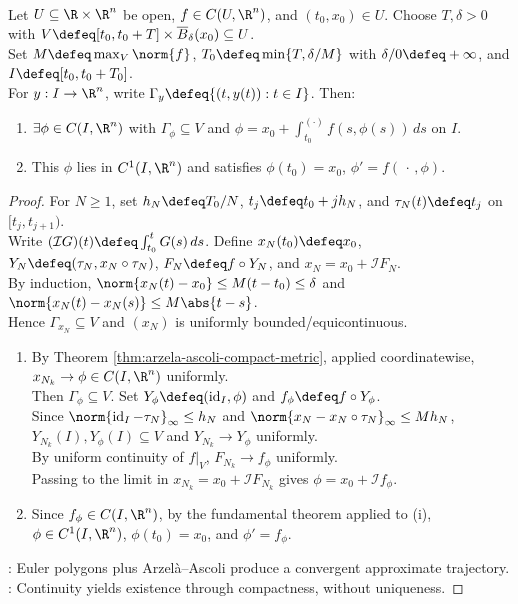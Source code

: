 \begin{theorem} \label{thm:peano-local-existence} \\
Let $U\subseteq\R\times\R^n$ be open, $f\in C(U,\R^n)$, and $(t_0,x_0)\in U$. Choose $T,\delta>0$ with $V\defeq[t_0,t_0+T]\times\overline B_\delta(x_0)\subseteq U$.\\
Set $M\defeq\max_V\norm{f}$, $T_0\defeq\min\{T,\delta/M\}$ with $\delta/0\defeq+\infty$, and $I\defeq[t_0,t_0+T_0]$.\\
For $y:I\to\R^n$, write $\Gamma_y\defeq\{(t,y(t)):t\in I\}$. Then:
\begin{enumerate}[label=(\roman*)]
\setlength{\itemsep}{0pt}
\item $\exists\phi\in C(I,\R^n)$ with $\Gamma_\phi\subseteq V$ and $\phi=x_0+\int_{t_0}^{(\cdot)} f(s,\phi(s))\,ds$ on $I$.
\item This $\phi$ lies in $C^1(I,\R^n)$ and satisfies $\phi(t_0)=x_0$, $\phi'=f(\,\cdot\,,\phi)$.
\end{enumerate}
\begin{proof}
For $N\geq1$, set $h_N\defeq T_0/N$, $t_j\defeq t_0+jh_N$, and $\tau_N(t)\defeq t_j$ on $[t_j,t_{j+1})$.\\
Write $(\mathcal IG)(t)\defeq\int_{t_0}^tG(s)\,ds$. Define $x_N(t_0)\defeq x_0$, $Y_N\defeq(\tau_N,x_N\circ\tau_N)$, $F_N\defeq f\circ Y_N$, and $x_N=x_0+\mathcal IF_N$.\\
By induction, $\norm{x_N(t)-x_0}\leq M(t-t_0)\leq\delta$ and $\norm{x_N(t)-x_N(s)}\leq M\abs{t-s}$.\\
Hence $\Gamma_{x_N}\subseteq V$ and $(x_N)$ is uniformly bounded/equicontinuous.
\begin{enumerate}[label=(\roman*)]
\setlength{\itemsep}{0pt}
\item By Theorem \ref{thm:arzela-ascoli-compact-metric}, applied coordinatewise, $x_{N_k}\to\phi\in C(I,\R^n)$ uniformly.\\
Then $\Gamma_\phi\subseteq V$. Set $Y_\phi\defeq(\operatorname{id}_I,\phi)$ and $f_\phi\defeq f\circ Y_\phi$.\\
Since $\norm{\operatorname{id}_I-\tau_N}_\infty\leq h_N$ and $\norm{x_N-x_N\circ\tau_N}_\infty\leq Mh_N$, $Y_{N_k}(I),Y_\phi(I)\subseteq V$ and $Y_{N_k}\to Y_\phi$ uniformly.\\
By uniform continuity of $f|_V$, $F_{N_k}\to f_\phi$ uniformly.\\
Passing to the limit in $x_{N_k}=x_0+\mathcal IF_{N_k}$ gives $\phi=x_0+\mathcal If_\phi$.
\item Since $f_\phi\in C(I,\R^n)$, by the fundamental theorem applied to (i), $\phi\in C^1(I,\R^n)$, $\phi(t_0)=x_0$, and $\phi'=f_\phi$.
\end{enumerate}
: Euler polygons plus Arzel\`a--Ascoli produce a convergent approximate trajectory.\\
: Continuity yields existence through compactness, without uniqueness.
\end{proof}
\end{theorem}

